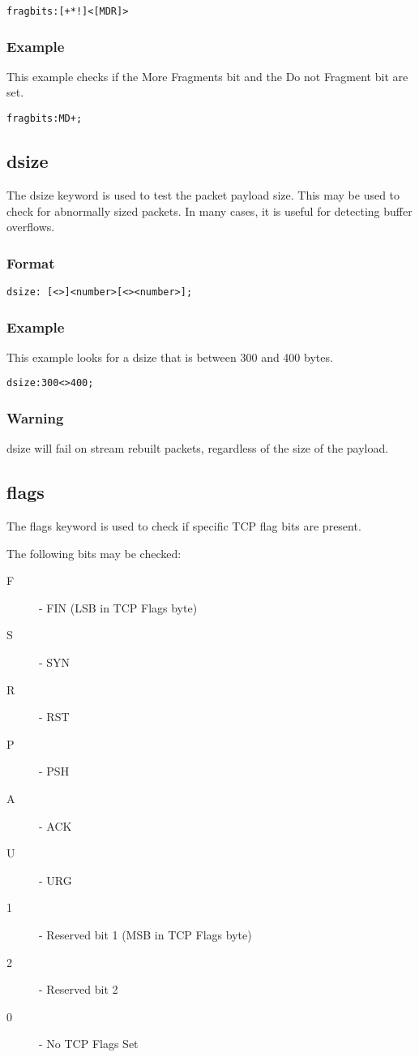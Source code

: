 \documentclass[english]{report}
\begin{document}
\begin{verbatim}
fragbits:[+*!]<[MDR]>
\end{verbatim}

\subsubsection{Example}

This example checks if the More Fragments bit and the Do not Fragment bit are
set.
\begin{verbatim}
fragbits:MD+;
\end{verbatim}

\subsection{dsize}

The dsize keyword is used to test the packet payload size.  This may be used to check for abnormally sized packets.  In many cases, it is useful for detecting buffer overflows.

\subsubsection{Format}
\begin{verbatim}
dsize: [<>]<number>[<><number>];
\end{verbatim}

\subsubsection{Example}
This example looks for a dsize that is between 300 and 400 bytes.
\begin{verbatim}
dsize:300<>400;
\end{verbatim}

\subsubsection{Warning}
dsize will fail on stream rebuilt packets, regardless of the size of the
payload.

\subsection{flags}

The flags keyword is used to check if specific TCP flag bits are present.

The following bits may be checked:
\begin{description}
\item [F] - FIN (LSB in TCP Flags byte)
\item [S] - SYN 
\item [R] - RST 
\item [P] - PSH 
\item [A] - ACK 
\item [U] - URG 
\item [1] - Reserved bit 1 (MSB in TCP Flags byte)
\item [2] - Reserved bit 2 
\item [0] - No TCP Flags Set
\end{description}
\end{document}
